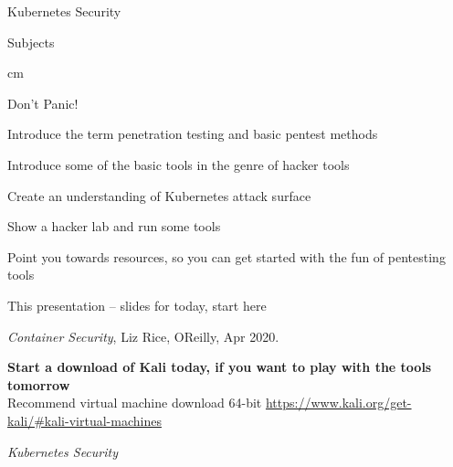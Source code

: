 \documentclass[Screen16to9,17pt]{foils}
\begin{document}
{}

\mytitlepage
{Kubernetes Security}

\LogoOn



\begin{list1}
\item Subjects
\begin{list2}
\item
\item
\item
\item
\end{list2}
\end{list1}


 cm

\centerline{\color{titlecolor}\LARGE Don't Panic!}


\begin{list1}
\item Introduce the term penetration testing and basic pentest methods
\item Introduce some of the basic tools in the genre of hacker tools
\item Create an understanding of Kubernetes attack surface
\item Show a hacker lab and run some tools
\item Point you towards resources, so you can get started with the fun of pentesting tools
\end{list1}


\begin{list2}
\item This presentation -- slides for today, start here
\item \emph{Container Security}, Liz Rice, OReilly, Apr 2020.
\end{list2}


{\bf Start a download of Kali today, if you want to play with the tools tomorrow}\\
Recommend virtual machine download 64-bit \url{https://www.kali.org/get-kali/#kali-virtual-machines}


\begin{list2}

\item \emph{Kubernetes Security}
\item
\end{list2}
\end{document}

